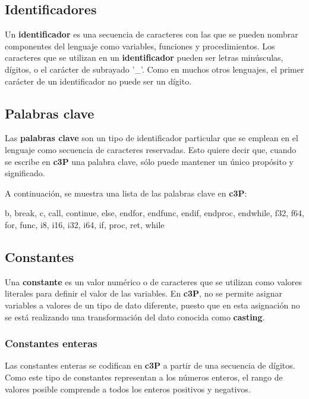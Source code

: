 \subsection{Identificadores}

Un \textbf{identificador} es una secuencia de caracteres con las que se pueden
nombrar componentes del lenguaje como variables, funciones y procedimientos. Los
caracteres que se utilizan en un \textbf{identificador} pueden ser letras minúsculas,
dígitos, o el carácter de subrayado '\_'. Como en muchos otros lenguajes, el primer
carácter de un identificador no puede ser un dígito.

\subsection{Palabras clave}

Las \textbf{palabras clave} son un tipo de identificador particular que se emplean en el
lenguaje como secuencia de caracteres reservadas. Esto quiere decir que, cuando se escribe
en \textbf{c3P} una palabra clave, sólo puede mantener un único propósito y significado.

A continuación, se muestra una lista de las palabras clave en \textbf{c3P}:

b, break, c, call, continue, else, endfor, endfunc, endif, endproc,
endwhile, f32, f64, for, func, i8, i16, i32, i64, if, proc, ret, while

\subsection{Constantes}

Una \textbf{constante} es un valor numérico o de caracteres que se utilizan como valores
literales para definir el valor de las variables. En \textbf{c3P}, no se permite asignar
variables a valores de un tipo de dato diferente, puesto que en esta asignación no se
está realizando una transformación del dato conocida como \textbf{casting}.

\subsubsection{Constantes enteras}

Las constantes enteras se codifican en \textbf{c3P} a partir de una secuencia de dígitos.
Como este tipo de constantes representan a los números enteros, el rango de valores posible
comprende a todos los enteros positivos y negativos.

